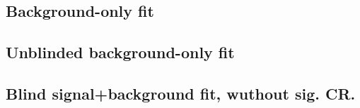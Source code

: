 \subsection{Background-only fit}
\label{sec:bonly-appendix}


\subsection{Unblinded background-only fit}
\label{sec:bonly-unblind-appendix}


\subsection{Blind signal+background fit, wuthout \ETmiss sig. CR.}
\label{sec:bonly-nocr-appendix}

\clearpage
